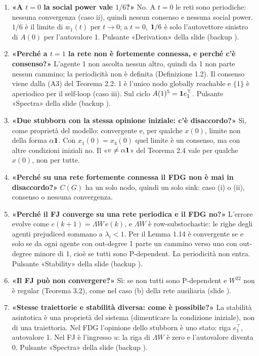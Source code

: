 \begin{enumerate}[leftmargin=1.6em,itemsep=3pt]
  \item \textbf{«A $t=0$ la social power vale $1/6$?»} No. A $t=0$ le reti sono periodiche: nessuna convergenza (caso ii), quindi nessun consenso e nessuna social power. $1/6$ è il limite di $w_1(t)$ per $t\to0$; a $t=0$, $\mathbf{1}/6$ è solo l'autovettore sinistro di $A(0)$ per l'autovalore 1. Pulsante «Derivation» della slide  (backup ).
  \item \textbf{«Perché a $t=1$ la rete non è fortemente connessa, e perché c'è consenso?»} L'agente 1 non ascolta nessun altro, quindi da 1 non parte nessun cammino; la periodicità non è definita (Definizione 1.2). Il consenso viene dalla (A3) del Teorema 2.2: 1 è l'unico nodo globally reachable e $\{1\}$ è aperiodico per il self-loop (caso iii). Sul ciclo $A(1)^5=\mathbf{1} e_1^\top$. Pulsante «Spectra» della slide  (backup ).
  \item \textbf{«Due stubborn con la stessa opinione iniziale: c'è disaccordo?»} Sì, come proprietà del modello: convergente e, per qualche $x(0)$, limite non della forma $\alpha\mathbf{1}$. Con $x_1(0)=x_4(0)$ quel limite è un consenso, ma con altre condizioni iniziali no. Il «$v\neq\alpha\mathbf{1}$» del Teorema 2.4 vale per qualche $x(0)$, non per tutte.
  \item \textbf{«Perché su una rete fortemente connessa il FDG non è mai in disaccordo?»} $C(G)$ ha un solo nodo, quindi un solo sink: caso (i) o (ii), consenso o nessuna convergenza.
  \item \textbf{«Perché il FJ converge su una rete periodica e il FDG no?»} L'errore evolve come $e(k+1)=\Lambda W\,e(k)$, e $\Lambda W$ è row-substochastic: le righe degli agenti prejudiced sommano a $\lambda_i<1$. Per il Lemma 1.14 è convergente se e solo se da ogni agente con out-degree 1 parte un cammino verso uno con out-degree minore di 1, cioè se tutti sono P-dependent. La periodicità non entra. Pulsante «Stability» della slide  (backup ).
  \item \textbf{«Il FJ può non convergere?»} Sì: se non tutti sono P-dependent e $W^{22}$ non è regular (Teorema 3.2), come nel caso (b) della rete ausiliaria (slide ).
  \item \textbf{«Stesse traiettorie e stabilità diversa: come è possibile?»} La stabilità asintotica è una proprietà del sistema (dimenticare la condizione iniziale), non di una traiettoria. Nel FDG l'opinione dello stubborn è uno stato: riga $e_1^\top$, autovalore 1. Nel FJ è l'ingresso $u$: la riga di $\Lambda W$ è zero e l'autovalore diventa 0. Pulsante «Spectra» della slide  (backup ).

\end{enumerate}
